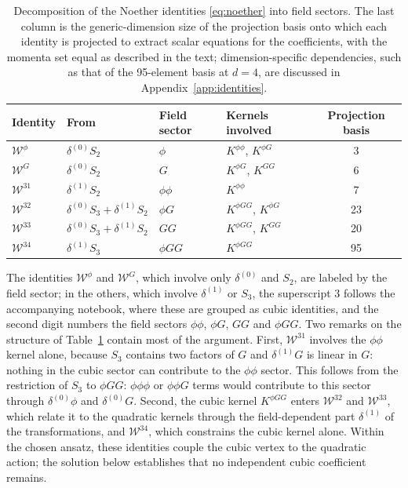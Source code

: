 \documentclass[prd,aps,preprint,nofootinbib,amsmath,amssymb,eqsecnum]{revtex4-2}
\newcommand{\W}{\mathcal{W}}
\begin{document}
\begin{table}[htb]
\centering
\setlength{\tabcolsep}{10pt}
\begin{tabular}{@{}llllc@{}}
\toprule
Identity & From & Field sector & Kernels involved & Projection basis \\
\midrule
$\W^{\phi}$  & $\delta^{(0)}S_2$ & $\phi$   & $K^{\phi\phi}$, $K^{\phi G}$ & 3 \\
$\W^{G}$     & $\delta^{(0)}S_2$ & $G$      & $K^{\phi G}$, $K^{GG}$ & 6 \\
$\W^{31}$    & $\delta^{(1)}S_2$ & $\phi\phi$ & $K^{\phi\phi}$ & 7 \\
$\W^{32}$    & $\delta^{(0)}S_3+\delta^{(1)}S_2$ & $\phi G$ & $K^{\phi GG}$, $K^{\phi G}$ & 23 \\
$\W^{33}$    & $\delta^{(0)}S_3+\delta^{(1)}S_2$ & $GG$ & $K^{\phi GG}$, $K^{GG}$ & 20 \\
$\W^{34}$    & $\delta^{(1)}S_3$ & $\phi GG$ & $K^{\phi GG}$ & 95 \\
\bottomrule
\end{tabular}
\caption{Decomposition of the Noether identities \eqref{eq:noether} into field sectors. The
last column is the generic-dimension size of the projection basis onto which each identity
is projected to extract scalar equations for the coefficients, with the momenta
set equal as described in the text; dimension-specific dependencies, such as that of the
95-element basis at $d=4$, are discussed in Appendix~\ref{app:identities}.}
\label{tab:identities}
\end{table}

The identities $\W^{\phi}$ and $\W^{G}$, which involve only $\delta^{(0)}$ and $S_2$, are
labeled by the field sector; in the others, which involve $\delta^{(1)}$ or $S_3$, the
superscript $3$ follows the accompanying notebook, where these are grouped as cubic
identities, and the second digit numbers the field sectors $\phi\phi$, $\phi G$, $GG$ and
$\phi GG$. Two remarks on the structure of Table~\ref{tab:identities} contain most of the argument. First,
$\W^{31}$ involves the $\phi\phi$ kernel alone, because $S_3$ contains two factors of $G$ and
$\delta^{(1)}G$ is linear in $G$: nothing in the cubic sector can contribute to the $\phi\phi$ sector. This follows from the restriction of $S_3$ to $\phi GG$: $\phi\phi\phi$ or $\phi\phi G$ terms would
contribute to this sector through $\delta^{(0)}\phi$ and $\delta^{(0)}G$.
Second, the cubic kernel $K^{\phi GG}$ enters $\W^{32}$ and $\W^{33}$, which relate it to
the quadratic kernels through the field-dependent part $\delta^{(1)}$ of the
transformations, and $\W^{34}$, which constrains the cubic kernel alone. Within the chosen
ansatz, these identities couple the cubic vertex to the quadratic action; the solution
below establishes that no independent cubic coefficient remains.
\end{document}
